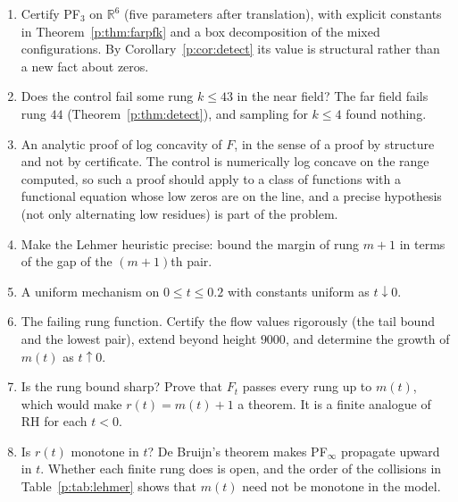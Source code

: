 \begin{enumerate}
\item Certify PF$_3$ on $\mathbb R^6$ (five parameters after translation), with explicit constants in Theorem~\ref{p:thm:farpfk} and a box decomposition of the mixed configurations. By Corollary~\ref{p:cor:detect} its value is structural rather than a new fact about zeros.
\item Does the control fail some rung $k\le43$ in the near field? The far field fails rung $44$ (Theorem~\ref{p:thm:detect}), and sampling for $k\le4$ found nothing.
\item An analytic proof of log concavity of $F$, in the sense of a proof by structure and not by certificate. The control is numerically log concave on the range computed, so such a proof should apply to a class of functions with a functional equation whose low zeros are on the line, and a precise hypothesis (not only alternating low residues) is part of the problem.
\item Make the Lehmer heuristic precise: bound the margin of rung $m+1$ in terms of the gap of the $(m+1)$th pair.
\item A uniform mechanism on $0\le t\le0.2$ with constants uniform as $t\downarrow0$.
\item The failing rung function. Certify the flow values rigorously (the tail bound and the lowest pair), extend beyond height $9000$, and determine the growth of $m(t)$ as $t\uparrow0$.
\item Is the rung bound sharp? Prove that $F_t$ passes every rung up to $m(t)$, which would make $r(t)=m(t)+1$ a theorem. It is a finite analogue of RH for each $t<0$.
\item Is $r(t)$ monotone in $t$? De Bruijn's theorem makes PF$_\infty$ propagate upward in $t$. Whether each finite rung does is open, and the order of the collisions in Table~\ref{p:tab:lehmer} shows that $m(t)$ need not be monotone in the model.
\end{enumerate}
